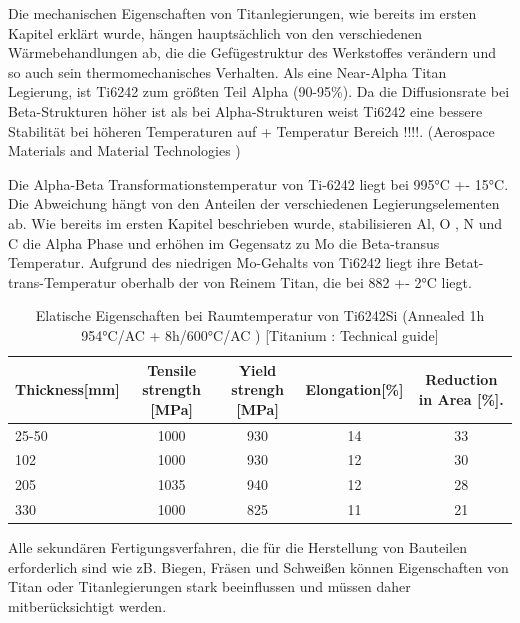 Die mechanischen Eigenschaften von Titanlegierungen, wie bereits im ersten Kapitel erklärt wurde, hängen hauptsächlich von den verschiedenen Wärmebehandlungen ab, die die Gefügestruktur des Werkstoffes  verändern und so auch sein thermomechanisches Verhalten.
Als eine Near-Alpha Titan Legierung, ist Ti6242 zum größten Teil Alpha (90-95\%). Da die Diffusionsrate bei Beta-Strukturen höher ist als bei Alpha-Strukturen weist Ti6242 eine bessere Stabilität bei höheren Temperaturen auf + Temperatur Bereich !!!!. (Aerospace Materials and Material Technologies ) 

Die Alpha-Beta Transformationstemperatur von Ti-6242 liegt bei 995°C +- 15°C. Die Abweichung hängt  von den Anteilen der verschiedenen Legierungselementen ab. Wie bereits im ersten Kapitel beschrieben wurde, stabilisieren  Al, O , N und C die Alpha Phase und erhöhen im Gegensatz zu Mo die Beta-transus Temperatur.
Aufgrund des niedrigen Mo-Gehalts von Ti6242 liegt ihre Betat-trans-Temperatur oberhalb der von Reinem Titan, die bei 882 +- 2°C liegt.


\begin{table}[H]
	\small
	\tabcolsep=0.11cm
	\centering	
	\begin{tabular}{|l |c |c|c |c|}
		\hline
		\centering
		Thickness[mm] & Tensile strength [MPa] & Yield strengh [MPa] & Elongation[\%]& Reduction in Area [\%]. \\
		\hline
		25-50&1000&930&14&33\\
		102&1000&930&12&30\\
		205&1035&940&12&28\\
		330&1000&825&11&21\\
		
		\hline
	\end{tabular}
	\caption{Elatische Eigenschaften bei Raumtemperatur von Ti6242Si (Annealed 1h 954°C/AC + 8h/600°C/AC )  [Titanium : Technical guide]}
	\label{Mecprop}
\end{table}







Alle sekundären Fertigungsverfahren, die für die Herstellung von Bauteilen erforderlich sind   wie zB. Biegen, Fräsen und Schweißen können Eigenschaften von Titan oder Titanlegierungen stark beeinflussen  und müssen daher mitberücksichtigt werden.




